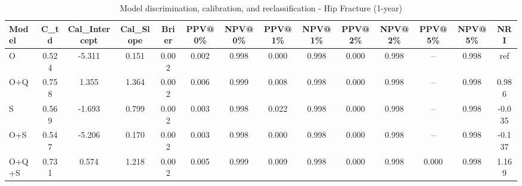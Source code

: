\begin{table}[htbp]
\centering
\small
\caption{Model discrimination, calibration, and reclassification - Hip Fracture (1-year)}
\label{tab:perf_pd_1y}
\begin{tabular}{lccccccccccccc}
\toprule
Model & C\_td & Cal\_Intercept & Cal\_Slope & Brier & PPV@0\% & NPV@0\% & PPV@1\% & NPV@1\% & PPV@2\% & NPV@2\% & PPV@5\% & NPV@5\% & NRI \\
\midrule
O & 0.524 & -5.311 & 0.151 & 0.002 & 0.002 & 0.998 & 0.000 & 0.998 & 0.000 & 0.998 & -- & 0.998 & ref \\
O+Q & 0.758 & 1.355 & 1.364 & 0.002 & 0.006 & 0.999 & 0.008 & 0.998 & 0.000 & 0.998 & -- & 0.998 & 0.986 \\
S & 0.569 & -1.693 & 0.799 & 0.002 & 0.003 & 0.998 & 0.022 & 0.998 & 0.000 & 0.998 & -- & 0.998 & -0.035 \\
O+S & 0.547 & -5.206 & 0.170 & 0.002 & 0.003 & 0.998 & 0.000 & 0.998 & 0.000 & 0.998 & -- & 0.998 & -0.137 \\
O+Q+S & 0.731 & 0.574 & 1.218 & 0.002 & 0.005 & 0.999 & 0.009 & 0.998 & 0.000 & 0.998 & 0.000 & 0.998 & 1.169 \\
\bottomrule
\end{tabular}
\end{table}